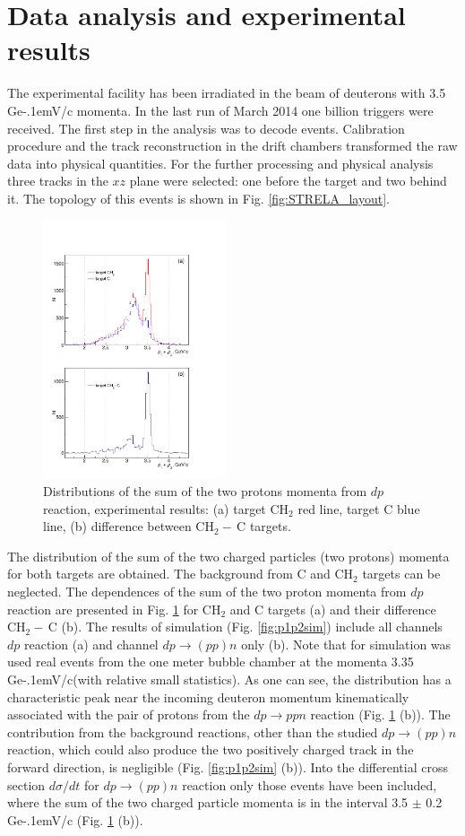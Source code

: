 \documentclass[twocolumn,epjc3]{svjour3}
\newcommand{\dpfrag} {\ensuremath{dp \rightarrow ppn}\xspace}
\newcommand{\dpchex} {\ensuremath{dp \rightarrow (pp)n}\xspace}
\newcommand{\GeVc}   {Ge\kern-.1emV/c\xspace}
\begin{document}
\section{Data analysis and experimental results}
The experimental facility has been irradiated in the beam of deuterons with 3.5
\GeVc momenta. In the last run of March 2014 one billion triggers were received.
The first step in the analysis was to decode events. Calibration procedure and
the track reconstruction in the drift chambers transformed the raw data into
physical quantities. For the further processing and physical analysis three
tracks in the $xz$ plane were selected: one before the target and two behind it.
The topology of this events is shown in Fig. \ref{fig:STRELA_layout}.

\begin{figure}[h]
  \centering
  \includegraphics[width=0.48\textwidth]{p1_plus_p2_1.pdf}
  \caption{Distributions of the sum of the two protons momenta from $dp$
    reaction, experimental results: (a) target CH$_2$ red line, target C blue
    line, (b) difference between CH$_2-$\,C targets.}
  \label{fig:p1p2exp}
\end{figure}

The distribution of the sum of the two charged particles (two protons) momenta
for both targets are obtained. The background from C and CH$_2$ targets can be
neglected. The dependences of the sum of the two proton momenta from $dp$
reaction are presented in Fig. \ref{fig:p1p2exp} for CH$_2$ and C targets (a)
and their difference CH$_2-\,$C (b). The results of simulation
(Fig. \ref{fig:p1p2sim}) include all channels $dp$ reaction (a) and channel
\dpchex only (b). Note that for simulation was used real events from the one
meter bubble chamber at the momenta 3.35 \GeVc (with relative small statistics).
As one can see, the distribution has a characteristic peak near the incoming
deuteron momentum kinematically associated with the pair of protons from the
\dpfrag reaction (Fig. \ref{fig:p1p2exp} (b)). The contribution from the
background reactions, other than the studied \dpchex reaction, which could also
produce the two positively charged track in the forward direction, is negligible
(Fig. \ref{fig:p1p2sim} (b)). Into the differential cross section $d\sigma/dt$
for \dpchex reaction only those events have been included, where the sum of the
two charged particle momenta is in the interval 3.5 $\pm$ 0.2 \GeVc
(Fig. \ref{fig:p1p2exp} (b)).
\end{document}
